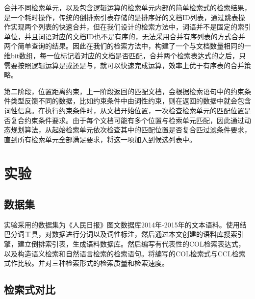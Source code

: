 \documentclass[11pt]{article}
\begin{document}
\begin{CJK*}{UTF8}{gbsn}
合并不同检索单元，以及包含逻辑运算的检索单元内部的简单检索式的检索结果，是一个耗时操作，传统的倒排索引表存储的是排序好的文档ID列表，通过跳表操作实现两个列表的快速合并，但在我们设计的检索方法中，词语并不是固定的索引单位，并且词语对应的文档ID也不是有序的，无法采用合并有序列表的方式合并两个简单查询的结果。因此在我们的检索方法中，构建了一个与文档数量相同的一维bit数组，每一位标记着对应的文档是否匹配，合并两个检索表达式的之后，只需要按照逻辑运算是或还是与，就可以快速完成运算，效率上优于有序表的合并策略。

第二阶段，位置距离约束，上一阶段返回的匹配文档，会根据检索语句中的约束条件类型反馈不同的数据，比如约束条件中由词性约束，则在返回的数据中就会包含词性信息。在执行约束条件时，从文档开始位置，一次检查检索单元的匹配位置是否复合约束条件要求。由于每个文档可能有多个位置与检索单元匹配，因此通过动态规划算法，从起始检索单元依次检查其中的匹配位置是否复合匹过滤条件要求，直到所有检索单元全部满足要求，将这一项加入到候选列表中。




\section{实验}

\subsection{数据集}

实验采用的数据集为《人民日报》图文数据库2014年-2015年的文本语料。使用结巴分词工具，对数据进行分词以及词性标注，然后通过本文创建的语料库搜索引擎，建立倒排索引表，生成语料数据库。然后编写有代表性的COL检索表达式，以及构造语义检索和自然语言检索的检索语句。将编写的COL检索式与CCL检索式作比较。并对三种检索形式的检索质量和检索速度。

\subsection{检索式对比}


\end{CJK*}
\end{document}
